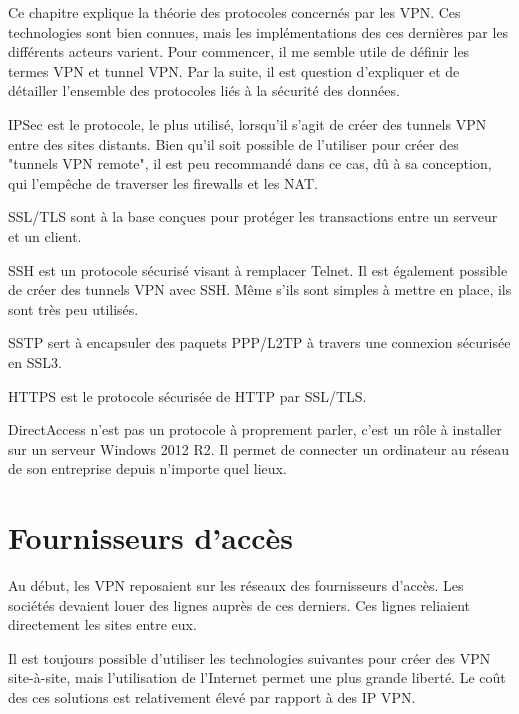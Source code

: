 Ce chapitre explique la théorie des protocoles concernés par les VPN.
Ces technologies sont bien connues, mais les implémentations des ces dernières par les différents acteurs varient.
Pour commencer, il me semble utile de définir les termes VPN et tunnel VPN.
Par la suite, il est question d'expliquer et de détailler l'ensemble des protocoles liés à la sécurité des données.

IPSec est le protocole, le plus utilisé, lorsqu'il s'agit de créer des tunnels VPN entre des sites distants. 
Bien qu'il soit possible de l'utiliser pour créer des "tunnels VPN remote", il est peu recommandé dans ce cas, dû à sa conception, qui l'empêche de traverser les firewalls et les NAT.

SSL/TLS sont à la base conçues pour protéger les transactions entre un serveur et un client.

SSH est un protocole sécurisé visant à remplacer Telnet. 
Il est également possible de créer des tunnels VPN avec SSH. 
Même s'ils sont simples à mettre en place, ils sont très peu utilisés.

SSTP sert à encapsuler des paquets PPP/L2TP à travers une connexion sécurisée en SSL3.

HTTPS est le protocole sécurisée de HTTP par SSL/TLS.

DirectAccess n'est pas un protocole à proprement parler, c'est un rôle à installer sur un serveur Windows 2012 R2.
Il permet de connecter un ordinateur au réseau de son entreprise depuis n'importe quel lieux.









%

\section{Fournisseurs d'accès}
Au début, les VPN reposaient sur les réseaux des fournisseurs d'accès.
Les sociétés devaient louer des lignes auprès de ces derniers. 
Ces lignes reliaient directement les sites entre eux.

Il est toujours possible d'utiliser les technologies suivantes pour créer des VPN site-à-site, mais l'utilisation de l'Internet permet une plus grande liberté.
Le coût des ces solutions est relativement élevé par rapport à des IP VPN.



